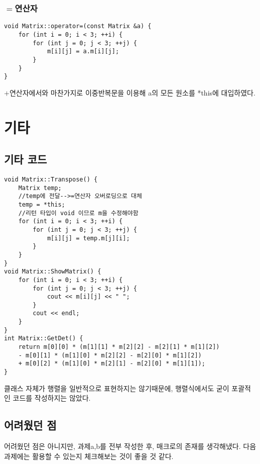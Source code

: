 \documentclass[a4paper,11pt]{article}
\begin{document}
\subsubsection{$=$연산자}
\begin{Verbatim}
void Matrix::operator=(const Matrix &a) {
	for (int i = 0; i < 3; ++i) {
		for (int j = 0; j < 3; ++j) {
			m[i][j] = a.m[i][j];
		}
	}
}
\end{Verbatim}
$+$연산자에서와 마찬가지로 이중반복문을 이용해 a의 모든 원소를 *this에 대입하였다.
\section{기타}
\subsection{기타 코드}
\begin{Verbatim}
void Matrix::Transpose() {
	Matrix temp;
	//temp에 전달-->=연산자 오버로딩으로 대체
	temp = *this;
	//리턴 타입이 void 이므로 m을 수정해야함
	for (int i = 0; i < 3; ++i) {
		for (int j = 0; j < 3; ++j) {
			m[i][j] = temp.m[j][i];
		}
	}
}
void Matrix::ShowMatrix() {
	for (int i = 0; i < 3; ++i) {
		for (int j = 0; j < 3; ++j) {
			cout << m[i][j] << " ";
		}
		cout << endl;
	}
}
int Matrix::GetDet() {
	return m[0][0] * (m[1][1] * m[2][2] - m[2][1] * m[1][2]) 
	- m[0][1] * (m[1][0] * m[2][2] - m[2][0] * m[1][2]) 
	+ m[0][2] * (m[1][0] * m[2][1] - m[2][0] * m[1][1]);
}
\end{Verbatim}
클래스 자체가 행렬을 일반적으로 표현하지는 않기때문에, 행렬식에서도 굳이 포괄적인 코드를 작성하지는 않았다.
\subsection{어려웠던 점}
어려웠던 점은 아니지만, 과제a,b를 전부 작성한 후, 매크로의 존재를 생각해냈다. 다음 과제에는 활용할 수 있는지 체크해보는 것이 좋을 것 같다.
\end{document}

